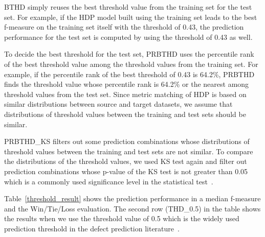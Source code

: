 BTHD simply reuses the best threshold value from the training set for the test set. For example, if the HDP model built using the training set leads to the best f-measure on the training set itself with the threshold of 0.43, the prediction performance for the test set is computed by using the threshold of 0.43 as well.

To decide the best threshold for the test set, PRBTHD uses the percentile rank of the best threshold value among the threshold values from the training set.  For example, if the percentile rank of the best threshold of 0.43 is 64.2\%, PRBTHD finds the threshold value whose percentile rank is 64.2\% or the nearest among threshold values from the test set. Since metric matching of HDP is based on similar distributions between source and target datasets, we assume that distributions of threshold values between the training and test sets should be similar.

PRBTHD\_KS filters out some prediction combinations whose distributions of threshold values between the training and test sets are not similar. To compare the distributions of the threshold values, we used KS test again and filter out prediction combinations whose p-value of the KS test is not greater than 0.05 which is a commonly used significance level in the
statistical test~\cite{Corder09}.

Table~\ref{threshold_result} shows the prediction performance in a median f-measure and the Win/Tie/Loss evaluation. The second row (THD\_0.5) in the table shows the results when we use the threshold value of 0.5 which is the widely used prediction threshold in the defect prediction literature~\cite{Lee11,Rahman13,Herzig13,Zimmermann09}. 

